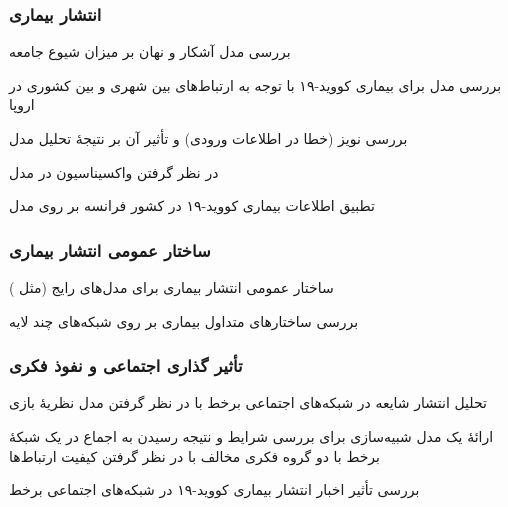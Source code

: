 \documentclass[xcolor=dvipsnames, professionalfonts, aspectratio=169, 11pt]{beamer}
\begin{document}
\begin{frame}
    \frametitle{انتشار بیماری}

    \begin{moredi}
        \item بررسی مدل آشکار و نهان بر میزان شیوع جامعه \cite{chen2020time}
        \item بررسی مدل  برای بیماری کووید-۱۹ با توجه به ارتباط‌های بین شهری و بین کشوری در اروپا \cite{wang2019coevolution,estrada2020covid}
        \item بررسی نویز (خطا در اطلاعات ورودی) و تأثیر آن بر نتیجهٔ تحلیل مدل  \cite{vizuete2020graphon}
        \item در نظر گرفتن واکسیناسیون در مدل  \cite{khanjanianpak2020competition}
        \item تطبیق اطلاعات بیماری کووید-۱۹ در کشور فرانسه بر روی مدل  \cite{efimov2020interval}
    \end{moredi}

\end{frame}

\begin{frame}
    \frametitle{ساختار عمومی انتشار بیماری}

    \begin{moredi}
        \item ساختار عمومی انتشار بیماری برای مدل‌های رایج (مثل ) \cite{moon2020group}
        \item بررسی ساختارهای متداول بیماری بر روی شبکه‌های چند لایه \cite{abhishek2020sis}
    \end{moredi}

\end{frame}

\begin{frame}
    \frametitle{تأثیر گذاری اجتماعی و نفوذ فکری}

    \begin{moredi}
        \item تحلیل انتشار شایعه در شبکه‌های اجتماعی برخط با در نظر گرفتن مدل نظریهٔ بازی \cite{huang2020developing}
        \item ارائهٔ یک مدل شبیه‌سازی برای بررسی شرایط و نتیجه رسیدن به اجماع  در یک شبکهٔ برخط با دو گروه فکری مخالف با در نظر گرفتن کیفیت ارتباط‌ها \cite{bolzern2020opinion,nettasinghe2019diffusion}
        \item بررسی تأثیر اخبار انتشار بیماری کووید-۱۹ در شبکه‌های اجتماعی برخط \cite{cinelli2020covid}
    \end{moredi}

\end{frame}
\end{document}
